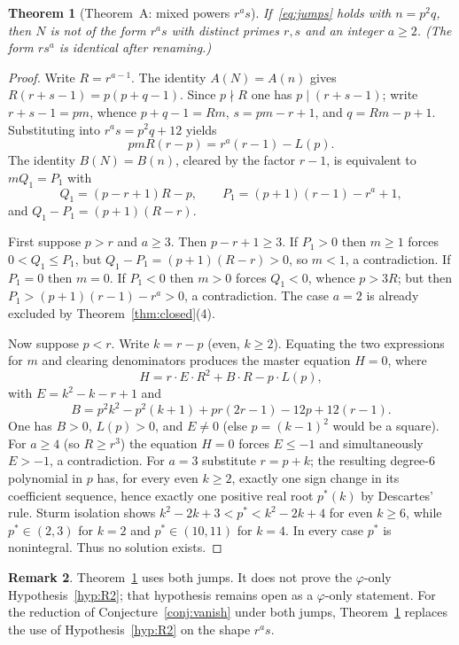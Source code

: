 \documentclass[11pt,reqno]{amsart}
\newcommand{\ph}{\varphi}
\newtheorem{theorem}{Theorem}
\theoremstyle{definition}
\newtheorem{remark}[theorem]{Remark}
\begin{document}
\begin{theorem}[Theorem~A: mixed powers \(r^as\)]
\label{thm:A}
If~\eqref{eq:jumps} holds with \(n=p^2q\), then \(N\) is not of the form \(r^as\) with distinct primes \(r,s\) and an integer \(a\ge 2\). (The form \(rs^a\) is identical after renaming.)
\end{theorem}

\begin{proof}
Write \(R=r^{a-1}\). The identity \(A(N)=A(n)\) gives \(R(r+s-1)=p(p+q-1)\). Since \(p\nmid R\) one has \(p\mid(r+s-1)\); write \(r+s-1=pm\), whence \(p+q-1=Rm\), \(s=pm-r+1\), and \(q=Rm-p+1\). Substituting into \(r^as=p^2q+12\) yields
\[
pmR(r-p)=r^a(r-1)-L(p).
\]
The identity \(B(N)=B(n)\), cleared by the factor \(r-1\), is equivalent to \(mQ_1=P_1\) with
\[
Q_1=(p-r+1)R-p,\qquad P_1=(p+1)(r-1)-r^a+1,
\]
and \(Q_1-P_1=(p+1)(R-r)\).

First suppose \(p>r\) and \(a\ge 3\). Then \(p-r+1\ge 3\). If \(P_1>0\) then \(m\ge 1\) forces \(0<Q_1\le P_1\), but \(Q_1-P_1=(p+1)(R-r)>0\), so \(m<1\), a contradiction. If \(P_1=0\) then \(m=0\). If \(P_1<0\) then \(m>0\) forces \(Q_1<0\), whence \(p>3R\); but then \(P_1>(p+1)(r-1)-r^a>0\), a contradiction. The case \(a=2\) is already excluded by Theorem~\ref{thm:closed}(4).

Now suppose \(p<r\). Write \(k=r-p\) (even, \(k\ge 2\)). Equating the two expressions for \(m\) and clearing denominators produces the master equation \(H=0\), where
\[
H=r\cdot E\cdot R^2+B\cdot R-p\cdot L(p),
\]
with \(E=k^2-k-r+1\) and
\[
B=p^2k^2-p^2(k+1)+pr(2r-1)-12p+12(r-1).
\]
One has \(B>0\), \(L(p)>0\), and \(E\neq 0\) (else \(p=(k-1)^2\) would be a square). For \(a\ge 4\) (so \(R\ge r^3\)) the equation \(H=0\) forces \(E\le -1\) and simultaneously \(E>-1\), a contradiction. For \(a=3\) substitute \(r=p+k\); the resulting degree-6 polynomial in \(p\) has, for every even \(k\ge 2\), exactly one sign change in its coefficient sequence, hence exactly one positive real root \(p^*(k)\) by Descartes' rule. Sturm isolation shows \(k^2-2k+3<p^*<k^2-2k+4\) for even \(k\ge 6\), while \(p^*\in(2,3)\) for \(k=2\) and \(p^*\in(10,11)\) for \(k=4\). In every case \(p^*\) is nonintegral. Thus no solution exists.
\end{proof}

\begin{remark}
Theorem~\ref{thm:A} uses both jumps. It does not prove the \(\ph\)-only Hypothesis~\ref{hyp:R2}; that hypothesis remains open as a \(\ph\)-only statement. For the reduction of Conjecture~\ref{conj:vanish} under both jumps, Theorem~\ref{thm:A} replaces the use of Hypothesis~\ref{hyp:R2} on the shape \(r^as\).
\end{remark}
\end{document}
